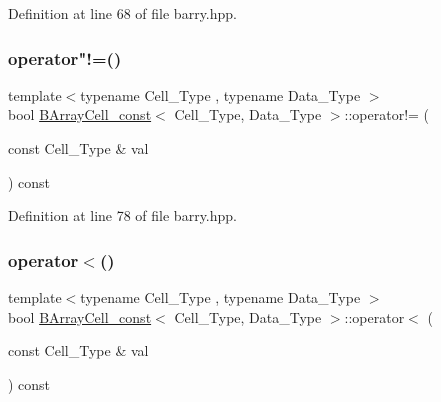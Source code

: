 Definition at line 68 of file barry.\+hpp.

\mbox{\label{classbarry_1_1_b_array_cell__const_a967bb71b2c9efefd1970959e1d498089}} 
\subsubsection{\texorpdfstring{operator"!=()}{operator!=()}}
{\footnotesize\ttfamily template$<$typename Cell\+\_\+\+Type , typename Data\+\_\+\+Type $>$ \\
bool \hyperlink{classbarry_1_1_b_array_cell__const}{B\+Array\+Cell\+\_\+const}$<$ Cell\+\_\+\+Type, Data\+\_\+\+Type $>$\+::operator!= (\begin{DoxyParamCaption}\item[{const Cell\+\_\+\+Type \&}]{val }\end{DoxyParamCaption}) const\hspace{0.3cm}{\ttfamily [inline]}}



Definition at line 78 of file barry.\+hpp.

\mbox{\label{classbarry_1_1_b_array_cell__const_a93af7c10baa4961aa71350180e579459}} 
\subsubsection{\texorpdfstring{operator$<$()}{operator<()}}
{\footnotesize\ttfamily template$<$typename Cell\+\_\+\+Type , typename Data\+\_\+\+Type $>$ \\
bool \hyperlink{classbarry_1_1_b_array_cell__const}{B\+Array\+Cell\+\_\+const}$<$ Cell\+\_\+\+Type, Data\+\_\+\+Type $>$\+::operator$<$ (\begin{DoxyParamCaption}\item[{const Cell\+\_\+\+Type \&}]{val }\end{DoxyParamCaption}) const\hspace{0.3cm}{\ttfamily [inline]}}



